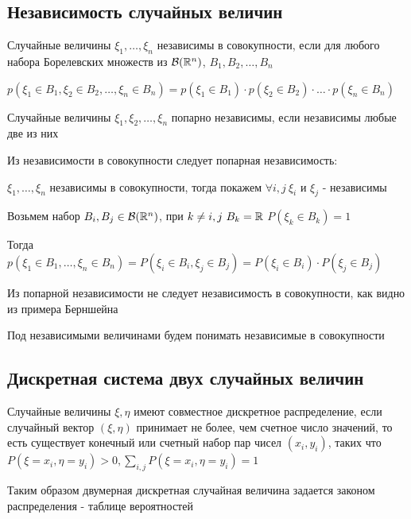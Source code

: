 \documentclass[12pt]{article}
\begin{document}
    \hypertarget{randomvariablesindependence}{}

    \subsection{Независимость случайных величин}

    \Def Случайные величины $\xi_1, \dots, \xi_n$ независимы в совокупности, если для любого набора Борелевских множеств из
    $\mathcal{B}(\mathbb{R}^n)$, $B_1, B_2, \dots, B_n$

    $p(\xi_1 \in B_1, \xi_2 \in B_2, \dots, \xi_n \in B_n) = p(\xi_1 \in B_1) \cdot p(\xi_2 \in B_2) \cdot \dots \cdot p(\xi_n \in B_n)$

    \Def Случайные величины $\xi_1, \xi_2, \dots, \xi_n$ попарно независимы, если независимы любые две из них

    \Notas Из независимости в совокупности следует попарная независимость: 

    $\xi_1, \dots, \xi_n$ независимы в совокупности, тогда покажем $\forall i, j \ \xi_i$ и $\xi_j$ - независимы

    Возьмем набор $B_i, B_j \in \mathcal{B}(\mathbb{R}^n)$, при $k \neq i, j \ B_k = \mathbb{R}$ \hfill $P(\xi_k \in B_k) = 1$

    Тогда $p(\xi_1 \in B_1, \dots, \xi_n \in B_n) = P(\xi_i \in B_i, \xi_j \in B_j) = P(\xi_i \in B_i) \cdot P(\xi_j \in B_j)$

    \Nota Из попарной независимости не следует независимость в совокупности, как видно из примера Берншейна

    Под независимыми величинами будем понимать независимые в совокупности

    \hypertarget{discretesystemoftwovariables}{}

    \subsection{Дискретная система двух случайных величин}

    \Def Случайные величины $\xi, \eta$ имеют совместное дискретное распределение, если случайный вектор $(\xi, \eta)$
    принимает не более, чем счетное число значений, то есть существует конечный или счетный набор пар чисел $(x_i, y_i)$, 
    таких что $P(\xi = x_i, \eta = y_i) > 0, \sum_{i, j} P(\xi = x_i, \eta = y_i) = 1$

    Таким образом двумерная дискретная случайная величина задается законом распределения - таблице вероятностей
\end{document}
